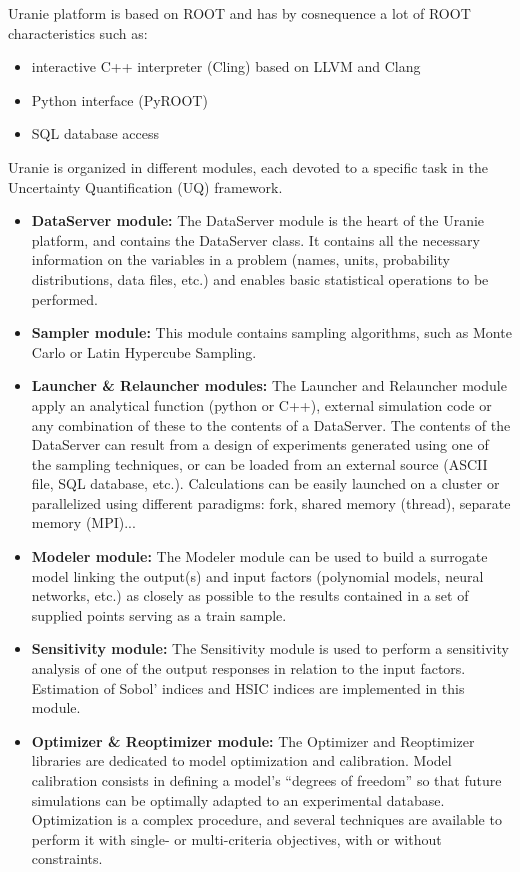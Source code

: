 Uranie platform is based on ROOT and has by cosnequence a lot of ROOT characteristics such as:
\begin{itemize}
    \item interactive C++ interpreter (Cling) based on LLVM and Clang 
    \item Python interface (PyROOT)
    \item SQL database access 
\end{itemize}
Uranie is organized in different modules, each devoted to a specific task in the Uncertainty Quantification (UQ) framework. 
\begin{itemize}
    \item \textbf{DataServer module:} The DataServer module is the heart of the Uranie platform, and contains the DataServer class. It contains all the necessary information on the variables in a problem (names, units, probability distributions, data files, etc.) and enables basic statistical operations to be performed.
    \item \textbf{Sampler module:} This module contains sampling algorithms, such as Monte Carlo or Latin Hypercube Sampling. 
    \item \textbf{Launcher \& Relauncher modules:} The Launcher and Relauncher module apply an analytical function (python or C++), external simulation code or any combination of these to the contents of a DataServer. The contents of the DataServer can result from a design of experiments generated using one of the sampling techniques, or can be loaded from an external source (ASCII file, SQL database, etc.). Calculations can be easily launched on a cluster or parallelized using different paradigms: fork, shared memory (thread), separate memory (MPI)...
    \item \textbf{Modeler module:} The Modeler module can be used to build a surrogate model linking the output(s) and input factors (polynomial models, neural networks, etc.) as closely as possible to the results contained in a set of supplied points serving as a train sample.
    \item \textbf{Sensitivity module:} The Sensitivity module is used to perform a sensitivity analysis of one of the output responses in relation to the input factors. Estimation of Sobol' indices and HSIC indices are implemented in this module.
    \item \textbf{Optimizer \& Reoptimizer module:} The Optimizer and Reoptimizer libraries are dedicated to model optimization and calibration. Model calibration consists in defining a model's “degrees of freedom” so that future simulations can be optimally adapted to an experimental database. Optimization is a complex procedure, and several techniques are available to perform it with single- or multi-criteria objectives, with or without constraints.

\end{itemize}
